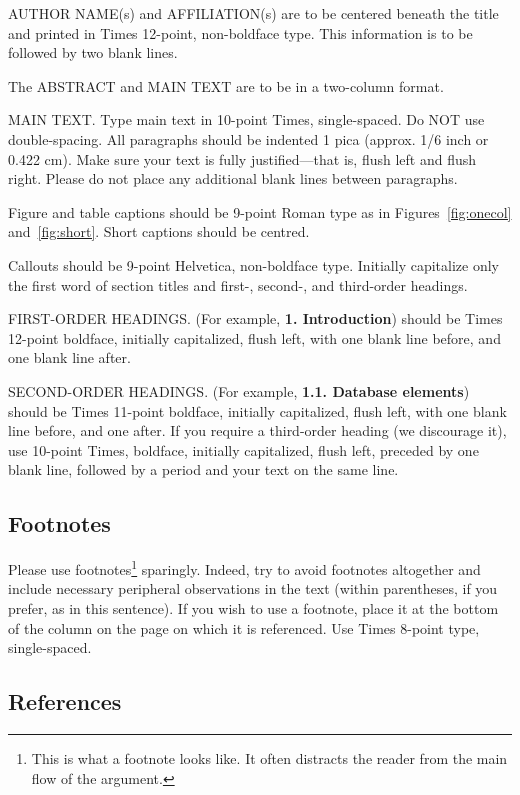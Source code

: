 \documentclass[10pt,twocolumn,letterpaper]{article}
\begin{document}
AUTHOR NAME(s) and AFFILIATION(s) are to be centered beneath the title
and printed in Times 12-point, non-boldface type. This information is to
be followed by two blank lines.

The ABSTRACT and MAIN TEXT are to be in a two-column format.

MAIN TEXT. Type main text in 10-point Times, single-spaced. Do NOT use
double-spacing. All paragraphs should be indented 1 pica (approx. 1/6
inch or 0.422 cm). Make sure your text is fully justified---that is,
flush left and flush right. Please do not place any additional blank
lines between paragraphs.

Figure and table captions should be 9-point Roman type as in
Figures~\ref{fig:onecol} and~\ref{fig:short}.  Short captions should be centred.

\noindent Callouts should be 9-point Helvetica, non-boldface type.
Initially capitalize only the first word of section titles and first-,
second-, and third-order headings.

FIRST-ORDER HEADINGS. (For example, {\large \bf 1. Introduction})
should be Times 12-point boldface, initially capitalized, flush left,
with one blank line before, and one blank line after.

SECOND-ORDER HEADINGS. (For example, { \bf 1.1. Database elements})
should be Times 11-point boldface, initially capitalized, flush left,
with one blank line before, and one after. If you require a third-order
heading (we discourage it), use 10-point Times, boldface, initially
capitalized, flush left, preceded by one blank line, followed by a period
and your text on the same line.

\subsection{Footnotes}

Please use footnotes\footnote {This is what a footnote looks like.  It
often distracts the reader from the main flow of the argument.} sparingly.
Indeed, try to avoid footnotes altogether and include necessary peripheral
observations in
the text (within parentheses, if you prefer, as in this sentence).  If you
wish to use a footnote, place it at the bottom of the column on the page on
which it is referenced. Use Times 8-point type, single-spaced.


\subsection{References}
\end{document}
